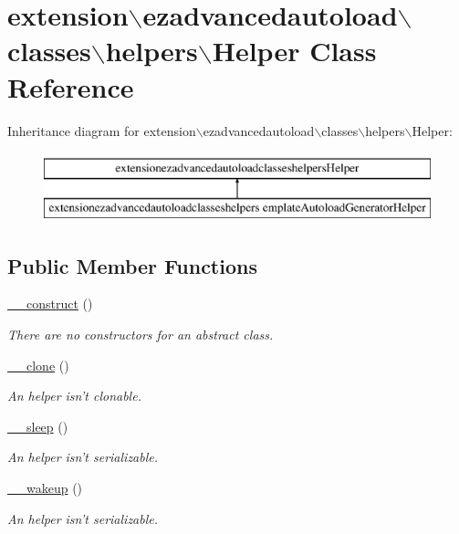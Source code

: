 \hypertarget{classextension_1_1ezadvancedautoload_1_1classes_1_1helpers_1_1_helper}{\section{extension$\backslash$ezadvancedautoload$\backslash$classes$\backslash$helpers$\backslash$Helper Class Reference}
\label{classextension_1_1ezadvancedautoload_1_1classes_1_1helpers_1_1_helper}
}
Inheritance diagram for extension$\backslash$ezadvancedautoload$\backslash$classes$\backslash$helpers$\backslash$Helper\-:\begin{figure}[H]
\begin{center}
\leavevmode
\includegraphics[height=2.000000cm]{classextension_1_1ezadvancedautoload_1_1classes_1_1helpers_1_1_helper}
\end{center}
\end{figure}
\subsection*{Public Member Functions}
\begin{DoxyCompactItemize}
\item 
\hyperlink{classextension_1_1ezadvancedautoload_1_1classes_1_1helpers_1_1_helper_add85e885141598709a72bfb9597faca7}{\-\_\-\-\_\-construct} ()
\begin{DoxyCompactList}\small\item\em There are no constructors for an abstract class. \end{DoxyCompactList}\item 
\hyperlink{classextension_1_1ezadvancedautoload_1_1classes_1_1helpers_1_1_helper_a1ba4093b3f040170370e36baaf970e60}{\-\_\-\-\_\-clone} ()
\begin{DoxyCompactList}\small\item\em An helper isn't clonable. \end{DoxyCompactList}\item 
\hyperlink{classextension_1_1ezadvancedautoload_1_1classes_1_1helpers_1_1_helper_a1bbf1edc42c8d0115a6164245faabf79}{\-\_\-\-\_\-sleep} ()
\begin{DoxyCompactList}\small\item\em An helper isn't serializable. \end{DoxyCompactList}\item 
\hyperlink{classextension_1_1ezadvancedautoload_1_1classes_1_1helpers_1_1_helper_a08df62000e6e73520c197c1f712e4ca8}{\-\_\-\-\_\-wakeup} ()
\begin{DoxyCompactList}\small\item\em An helper isn't serializable. \end{DoxyCompactList}\end{DoxyCompactItemize}


